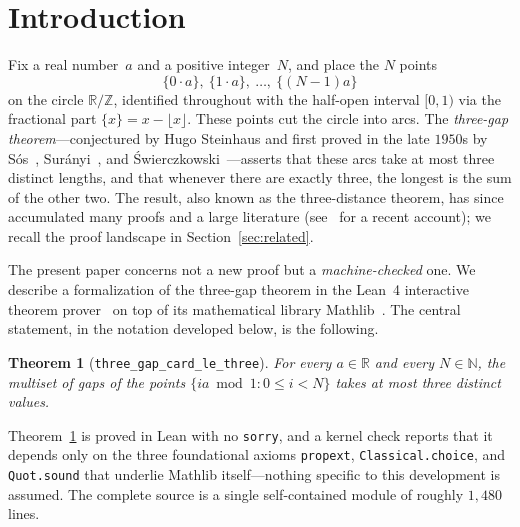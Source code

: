 \documentclass[11pt,reqno]{amsart}
\theoremstyle{plain}
\newtheorem{theorem}{Theorem}[section]
\theoremstyle{definition}
\theoremstyle{remark}
\newcommand{\Z}{\mathbb{Z}}
\newcommand{\R}{\mathbb{R}}
\newcommand{\N}{\mathbb{N}}
\newcommand{\fract}[1]{\{#1\}}
\newcommand{\code}[1]{\texttt{#1}}
\begin{document}
\section{Introduction}\label{sec:intro}

Fix a real number~$a$ and a positive integer~$N$, and place the $N$ points
\[
  \fract{0\cdot a},\ \fract{1\cdot a},\ \dots,\ \fract{(N-1)a}
\]
on the circle $\R/\Z$, identified throughout with the half-open interval
$[0,1)$ via the fractional part $\fract{x} = x - \lfloor x\rfloor$.  These
points cut the circle into arcs.  The \emph{three-gap theorem}---conjectured by
Hugo Steinhaus and first proved in the late $1950$s by
S\'os~\cite{Sos1958}, Sur\'anyi~\cite{Suranyi1958}, and
\'Swierczkowski~\cite{Swierczkowski1959}---asserts that these arcs take at most
three distinct lengths, and that whenever there are exactly three, the longest
is the sum of the other two.  The result, also known as the three-distance
theorem, has since accumulated many proofs and a large literature
(see~\cite{BertheReutenauer2024} for a recent account); we recall the proof
landscape in Section~\ref{sec:related}.

The present paper concerns not a new proof but a \emph{machine-checked} one.
We describe a formalization of the three-gap theorem in the Lean~4 interactive
theorem prover~\cite{Moura2021} on top of its mathematical library
Mathlib~\cite{Mathlib2020}.  The central statement, in the notation developed
below, is the following.

\begin{theorem}[\code{three\_gap\_card\_le\_three}]\label{thm:main}
For every $a\in\R$ and every $N\in\N$, the multiset of gaps of the points
$\{ia \bmod 1 : 0 \le i < N\}$ takes at most three distinct values.
\end{theorem}

Theorem~\ref{thm:main} is proved in Lean with no \code{sorry}, and a kernel
check reports that it depends only on the three foundational axioms
\code{propext}, \code{Classical.choice}, and \code{Quot.sound} that underlie
Mathlib itself---nothing specific to this development is assumed.  The complete
source is a single self-contained module of roughly $1{,}480$ lines.
\end{document}
